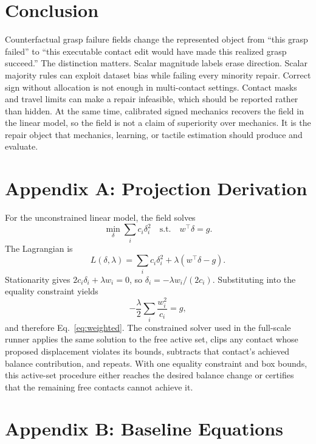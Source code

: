 \documentclass{article}
\begin{document}
\section{Conclusion}

Counterfactual grasp failure fields change the represented object from ``this grasp failed'' to ``this executable contact edit would have made this realized grasp succeed.'' The distinction matters. Scalar magnitude labels erase direction. Scalar majority rules can exploit dataset bias while failing every minority repair. Correct sign without allocation is not enough in multi-contact settings. Contact masks and travel limits can make a repair infeasible, which should be reported rather than hidden. At the same time, calibrated signed mechanics recovers the field in the linear model, so the field is not a claim of superiority over mechanics. It is the repair object that mechanics, learning, or tactile estimation should produce and evaluate.

\clearpage
\appendix

\section{Appendix A: Projection Derivation}

For the unconstrained linear model, the field solves
\begin{equation}
    \min_\delta \sum_i c_i\delta_i^2
    \quad \mathrm{s.t.}\quad
    w^\top\delta=g.
\end{equation}
The Lagrangian is
\begin{equation}
    L(\delta,\lambda)=\sum_i c_i\delta_i^2+\lambda(w^\top\delta-g).
\end{equation}
Stationarity gives $2c_i\delta_i+\lambda w_i=0$, so $\delta_i=-\lambda w_i/(2c_i)$. Substituting into the equality constraint yields
\begin{equation}
    -\frac{\lambda}{2}\sum_i\frac{w_i^2}{c_i}=g,
\end{equation}
and therefore Eq.~\ref{eq:weighted}. The constrained solver used in the full-scale runner applies the same solution to the free active set, clips any contact whose proposed displacement violates its bounds, subtracts that contact's achieved balance contribution, and repeats. With one equality constraint and box bounds, this active-set procedure either reaches the desired balance change or certifies that the remaining free contacts cannot achieve it.

\section{Appendix B: Baseline Equations}
\end{document}
